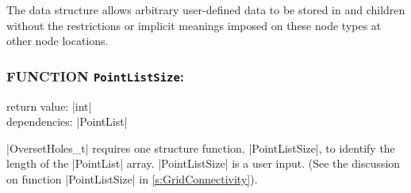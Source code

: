 The  data structure allows arbitrary
user-defined data to be stored in  and
 children without the restrictions or implicit
meanings imposed on these node types at other node locations.

\subsubsection*{FUNCTION \texttt{PointListSize}:}

\noindent return value: |int| \\
\noindent dependencies: |PointList|

|OversetHoles_t| requires one structure function, |PointListSize|, to 
identify the length of the |PointList| array.
|PointListSize| is a user input.
(See the discussion on function |PointListSize| in
\autoref{s:GridConnectivity}).

